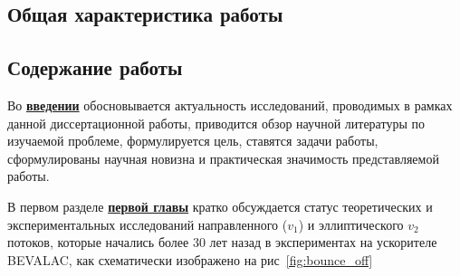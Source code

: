 \subsection*{Общая характеристика работы}

\newcommand{\actuality}{\underline{\textbf{Актуальность темы.}}}
\newcommand{\aim}{\underline{\textbf{Целью}}}
\newcommand{\tasks}{\underline{\textbf{задачи}}}
\newcommand{\defpositions}{\underline{\textbf{Основные положения, выносимые на~защиту:}}}
\newcommand{\novelty}{\underline{\textbf{Научная новизна:}}}
\newcommand{\influence}{\underline{\textbf{Практическая значимость}}}
\newcommand{\reliability}{\underline{\textbf{Достоверность}}}
\newcommand{\probation}{\underline{\textbf{Апробация работы.}}}
\newcommand{\contribution}{\underline{\textbf{Личный вклад.}}}
\newcommand{\publications}{\underline{\textbf{Публикации.}}}




\subsection*{Содержание работы}
Во \underline{\textbf{введении}} обосновывается актуальность исследований, проводимых в рамках данной диссертационной работы, приводится обзор научной литературы по изучаемой проблеме, формулируется цель, ставятся задачи работы, сформулированы научная новизна и практическая значимость представляемой работы.

В первом разделе \underline{\textbf{первой главы}}   кратко обсуждается статус теоретических и экспериментальных
исследований направленного ($v_1$) и эллиптического $v_2$ потоков, которые начались более 30 лет назад
в экспериментах на ускорителе BEVALAC, как схематически изображено на рис~\ref{fig:bounce_off}

